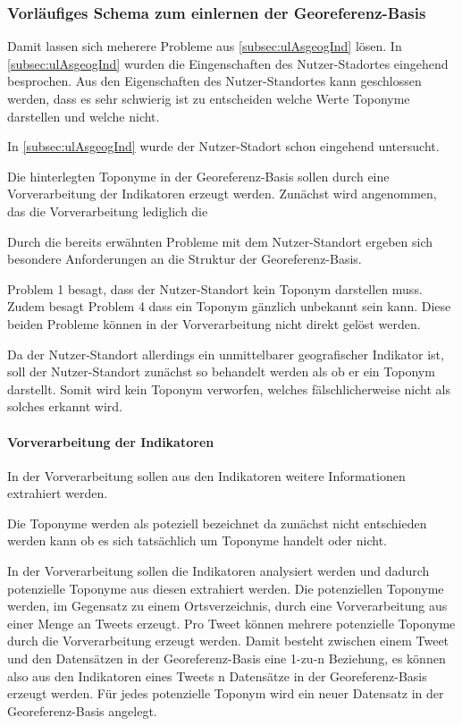  

					\subsubsection{Vorläufiges Schema zum einlernen der Georeferenz-Basis}

					Damit lassen sich meherere Probleme aus \ref{subsec:ulAsgeogInd} lösen.
					In \ref{subsec:ulAsgeogInd} wurden die Eingenschaften des Nutzer-Stadortes eingehend besprochen. 
					Aus den Eigenschaften des Nutzer-Standortes kann geschlossen werden, dass es sehr schwierig ist zu entscheiden welche Werte Toponyme darstellen und welche nicht.

					In \ref{subsec:ulAsgeogInd} wurde der Nutzer-Stadort schon eingehend untersucht. 


					Die hinterlegten Toponyme in der Georeferenz-Basis sollen durch eine Vorverarbeitung der Indikatoren erzeugt werden.
					Zunächst wird angenommen, das die Vorverarbeitung lediglich die 

					Durch die bereits erwähnten Probleme mit dem Nutzer-Standort ergeben sich besondere Anforderungen an die Struktur der Georeferenz-Basis.

					Problem 1 besagt, dass der Nutzer-Standort kein Toponym darstellen muss.
					Zudem besagt Problem 4 dass ein Toponym gänzlich unbekannt sein kann.
					Diese beiden Probleme können in der Vorverarbeitung nicht direkt gelöst werden.

					Da der Nutzer-Standort allerdings ein unmittelbarer geografischer Indikator ist, soll der Nutzer-Standort zunächst so behandelt werden als ob er ein 
					Toponym darstellt.
					Somit wird kein Toponym verworfen, welches fälschlicherweise nicht als solches erkannt wird. 



				  


				

					\paragraph{Vorverarbeitung der Indikatoren}  
						

						In der Vorverarbeitung sollen aus den Indikatoren weitere Informationen extrahiert werden. 

						Die Toponyme werden als poteziell bezeichnet da zunächst nicht entschieden werden kann ob es sich tatsächlich um Toponyme handelt oder nicht. 

						In der Vorverarbeitung sollen die Indikatoren analysiert werden und dadurch potenzielle Toponyme aus diesen extrahiert werden.
						Die potenziellen Toponyme werden, im Gegensatz zu einem Ortsverzeichnis, durch eine Vorverarbeitung aus einer Menge an Tweets erzeugt. 
						Pro Tweet können mehrere potenzielle Toponyme durch die Vorverarbeitung erzeugt werden.
						Damit besteht zwischen einem Tweet und den Datensätzen in der Georeferenz-Basis eine 1-zu-n Beziehung, es können also aus den Indikatoren eines Tweets n Datensätze in der Georeferenz-Basis erzeugt werden. 
						Für jedes potenzielle Toponym wird ein neuer Datensatz in der Georeferenz-Basis angelegt. 


